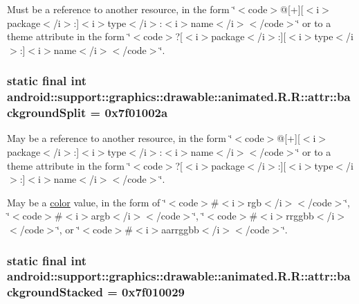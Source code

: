 Must be a reference to another resource, in the form \char`\"{}$<$code$>$@\mbox{[}+\mbox{]}\mbox{[}$<$i$>$package$<$/i$>$:\mbox{]}$<$i$>$type$<$/i$>$:$<$i$>$name$<$/i$>$$<$/code$>$\char`\"{} or to a theme attribute in the form \char`\"{}$<$code$>$?\mbox{[}$<$i$>$package$<$/i$>$:\mbox{]}\mbox{[}$<$i$>$type$<$/i$>$:\mbox{]}$<$i$>$name$<$/i$>$$<$/code$>$\char`\"{}. \hypertarget{classandroid_1_1support_1_1graphics_1_1drawable_1_1animated_1_1_r_1_1attr_67a5ddcfc7fdaf85312f23aa7944d1c2}{
\subsubsection[{backgroundSplit}]{\setlength{\rightskip}{0pt plus 5cm}static final int android::support::graphics::drawable::animated.R.R::attr::backgroundSplit = 0x7f01002a}}
\label{classandroid_1_1support_1_1graphics_1_1drawable_1_1animated_1_1_r_1_1attr_67a5ddcfc7fdaf85312f23aa7944d1c2}


May be a reference to another resource, in the form \char`\"{}$<$code$>$@\mbox{[}+\mbox{]}\mbox{[}$<$i$>$package$<$/i$>$:\mbox{]}$<$i$>$type$<$/i$>$:$<$i$>$name$<$/i$>$$<$/code$>$\char`\"{} or to a theme attribute in the form \char`\"{}$<$code$>$?\mbox{[}$<$i$>$package$<$/i$>$:\mbox{]}\mbox{[}$<$i$>$type$<$/i$>$:\mbox{]}$<$i$>$name$<$/i$>$$<$/code$>$\char`\"{}. 

May be a \hyperlink{classandroid_1_1support_1_1graphics_1_1drawable_1_1animated_1_1_r_1_1color}{color} value, in the form of \char`\"{}$<$code$>$\#$<$i$>$rgb$<$/i$>$$<$/code$>$\char`\"{}, \char`\"{}$<$code$>$\#$<$i$>$argb$<$/i$>$$<$/code$>$\char`\"{}, \char`\"{}$<$code$>$\#$<$i$>$rrggbb$<$/i$>$$<$/code$>$\char`\"{}, or \char`\"{}$<$code$>$\#$<$i$>$aarrggbb$<$/i$>$$<$/code$>$\char`\"{}. \hypertarget{classandroid_1_1support_1_1graphics_1_1drawable_1_1animated_1_1_r_1_1attr_6144be454eb022763bde8d7ff8829463}{
\subsubsection[{backgroundStacked}]{\setlength{\rightskip}{0pt plus 5cm}static final int android::support::graphics::drawable::animated.R.R::attr::backgroundStacked = 0x7f010029}}
\label{classandroid_1_1support_1_1graphics_1_1drawable_1_1animated_1_1_r_1_1attr_6144be454eb022763bde8d7ff8829463}



